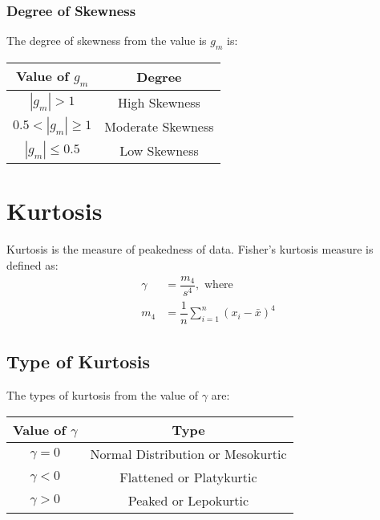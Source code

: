 \subsubsection{Degree of Skewness}
The degree of skewness from the value is $g_m$ is:
\begin{table}[htbp]
	\centering
	\begin{tabular}{c c}
		\toprule
		Value of $g_m$ & Degree\\
		\midrule
		$|g_m| > 1$ & High Skewness\\
		$0.5 <|g_m| \geq 1$ & Moderate Skewness\\
		$|g_m| \leq 0.5$ & Low Skewness\\
		\bottomrule
	\end{tabular}
\end{table}

\section{Kurtosis}
Kurtosis is the measure of peakedness of data. Fisher's kurtosis measure is defined as:
\begin{align}
	\gamma &= \dfrac{m_4}{s^4}, \text{ where}\\
	m_4 &= \dfrac{1}{n}\sum_{i=1}^{n} \left( x_i - \bar{x} \right)^4
\end{align}

\subsection{Type of Kurtosis}
The types of kurtosis from the value of $\gamma$ are:
\begin{table}[htbp]
	\centering
	\begin{tabular}{c c}
		\toprule
		Value of $\gamma$ & Type\\
		\midrule
		$\gamma = 0$ & Normal Distribution or Mesokurtic\\
		$\gamma < 0$ & Flattened or Platykurtic\\
		$\gamma > 0$ & Peaked or Lepokurtic\\
		\bottomrule
	\end{tabular}
\end{table}
